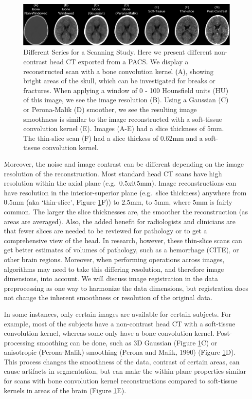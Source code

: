 \documentclass[utf8]{frontiersSCNS}
\begin{document}
\begin{figure}
\includegraphics[width=1\linewidth]{overlaid_slices} \caption{Different Series for a Scanning Study.  Here we present different non-contrast head CT exported from a PACS.  We display a reconstructed scan with a bone convolution kernel (A), showing bright areas of the skull, which can be investigated for breaks or fractures.  When applying a window of 0 - 100 Hounsfield units (HU) of this image, we see the image resolution (B).  Using a Gaussian (C) or Perona-Malik (D) smoother, we see the resulting image smoothness is similar to the image reconstructed with a soft-tissue convolution kernel (E).  Images (A-E) had a slice thickness of 5mm.  The thin-slice scan (F) had a slice thickess of 0.62mm and a soft-tissue convolution kernel.}\label{fig:overlay}
\end{figure}

Moreover, the noise and image contrast can be different depending on the image resolution of the reconstruction. Most standard head CT scans have high resolution within the axial plane (e.g.~\(0.5\)x\(0.5\)mm). Image reconstructions can have resolution in the interior-superior plane (e.g.~slice thickness) anywhere from \(0.5\)mm (aka `thin-slice', Figure \ref{fig:overlay}F)) to \(2.5\)mm, to \(5\)mm, where \(5\)mm is fairly common. The larger the slice thicknesses are, the smoother the reconstruction (as areas are averaged). Also, the added benefit for radiologists and clinicians are that fewer slices are needed to be reviewed for pathology or to get a comprehensive view of the head. In research, however, these thin-slice scans can get better estimates of volumes of pathology, such as a hemorrhage (CITE), or other brain regions. Moreover, when performing operations across images, algorithms may need to take this differing resolution, and therefore image dimensions, into account. We will discuss image registration in the data preprocessing as one way to harmonize the data dimensions, but registration does not change the inherent smoothness or resolution of the original data.

In some instances, only certain images are available for certain subjects. For example, most of the subjects have a non-contrast head CT with a soft-tissue convolution kernel, whereas some only have a bone convolution kernel. Post-processing smoothing can be done, such as 3D Gaussian (Figure \ref{fig:overlay}C) or anisotropic (Perona-Malik) smoothing (Perona and Malik, 1990) (Figure \ref{fig:overlay}D). This process changes the smoothness of the data, contrast of certain areas, can cause artifacts in segmentation, but can make the within-plane properties similar for scans with bone convolution kernel reconstructions compared to soft-tissue kernels in areas of the brain (Figure \ref{fig:overlay}E).
\end{document}
